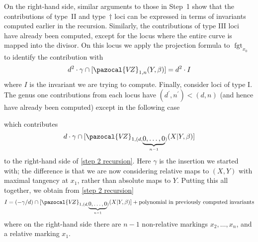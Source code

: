 \documentclass[11pt]{amsart}
\newcommand{\sqC}{\scalebox{0.8}[1.3]{$\sqsubset$}}
\newcommand{\VZ}{\pazocal{V\!Z}}
\newcommand{\fgt}{\operatorname{fgt}}
\theoremstyle{definition}
\theoremstyle{definition}
\begin{document}
On the right-hand side, similar arguments to those in Step~1 show that the contributions of type~II and type~$\dag$ loci can be expressed in terms of invariants computed earlier in the recursion. Similarly, the contributions of type III loci have already been computed, except for the locus where the entire curve is mapped into the divisor. On this locus we apply the projection formula to $\fgt_{x_0}$ to identify the contribution with
\begin{equation*} d^2 \cdot \gamma \cap [\VZ_{1,n}(Y,\beta)] = d^2 \cdot I \end{equation*}
where $I$ is the invariant we are trying to compute. Finally, consider loci of type I. The genus one contributions from each locus have $(d^\prime,n^\prime) < (d,n)$ (and hence have already been computed) except in the following case
\begin{center}
\end{center}
which contributes
\begin{equation*} d\cdot \gamma \cap [\VZ_{1,(d,\underbrace{0,\ldots,0}_{n-1})}(X|Y,\beta)]\end{equation*}
to the right-hand side of \eqref{step 2 recursion}. Here $\gamma$ is the insertion we started with; the difference is that we are now considering relative maps to $(X,Y)$ with maximal tangency at $x_1$, rather than absolute maps to $Y$. Putting this all together, we obtain from \eqref{step 2 recursion}
\begin{equation}\label{step 2 recursion 2} I = (-\gamma/d) \cap [\VZ_{1,(d,\underbrace{0,\ldots,0}_{n-1})}(X|Y,\beta)] + \text{polynomial in previously computed invariants} \end{equation}
where on the right-hand side there are $n-1$ non-relative markings $x_2,\ldots,x_n$, and a relative marking $x_1$.\medskip
\end{document}
